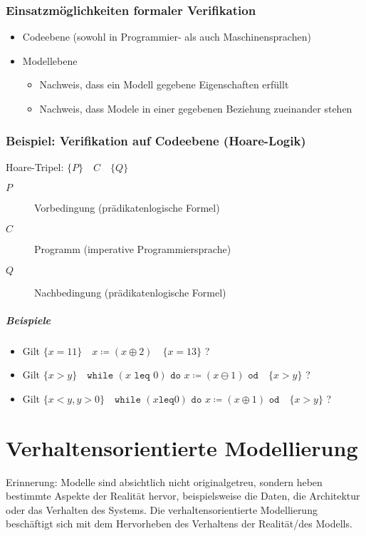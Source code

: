 		\subsection{Einsatzmöglichkeiten formaler Verifikation}
			\begin{itemize}
				\item Codeebene (sowohl in Programmier- als auch Maschinensprachen)
				\item Modellebene
					\begin{itemize}
						\item Nachweis, dass ein Modell gegebene Eigenschaften erfüllt
						\item Nachweis, dass Modele in einer gegebenen Beziehung zueinander stehen
					\end{itemize}
			\end{itemize}

		\subsection{Beispiel: Verifikation auf Codeebene (Hoare-Logik)}
			Hoare-Tripel: $ \{ P \} \quad C \quad \{ Q \} $
			\begin{description}
				\item[$ P $] Vorbedingung (prädikatenlogische Formel)
				\item[$ C $] Programm (imperative Programmiersprache)
				\item[$ Q $] Nachbedingung (prädikatenlogische Formel)
			\end{description}

			\paragraph{Beispiele}
				\begin{itemize}
					\item Gilt $ \{ x = 11 \} \quad x \coloneqq (x \oplus 2) \quad \{ x = 13 \} $ ?
					\item Gilt $ \{ x > y \} \quad \texttt{while } (x \texttt{ leq } 0) \texttt{ do } x \coloneqq (x \ominus 1) \texttt{ od} \quad \{ x > y \} $ ?
					\item Gilt $ \{ x < y, y > 0 \} \quad \texttt{while } (x \texttt{leq} 0) \texttt{ do } x \coloneqq (x \oplus 1) \texttt{ od} \quad \{ x > y \} $ ?
				\end{itemize}

\chapter{Verhaltensorientierte Modellierung}
	Erinnerung: Modelle sind absichtlich nicht originalgetreu, sondern heben bestimmte Aspekte der Realität hervor, beispielsweise die Daten, die Architektur oder das Verhalten des Systems. Die verhaltensorientierte Modellierung beschäftigt sich mit dem Hervorheben des Verhaltens der Realität/des Modells.

